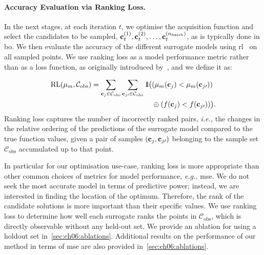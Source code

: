 \paragraph{Accuracy Evaluation via Ranking Loss.}
In the next stages, at each iteration $t$, we optimise the acquisition function and select the candidates to be sampled, $\mathbf{c}_t^{(1)},\mathbf{c}_t^{(2)},\dots,\mathbf{c}_t^{{(n_{\mathrm{batch}})}}$, as is typically done in \gls{bo}. We then evaluate the accuracy of the different surrogate models using \gls{rl}~\citep{FeuEtAl22b} on all sampled points.
We use ranking loss as a model performance metric
rather than as a loss function, as originally introduced by~\citet{WisEtAl16}, and we define it as:

    \begin{equation}
\label{eq:ch06:rl}
    \begin{aligned}
       \text{RL}(\mu_m, \mathcal C_{\mathrm{obs}}) =
        \sum_{\mathbf{c}_j\in \mathcal C_{\mathrm{obs}}}
        \sum_{\mathbf{c}_{j\prime}\in \mathcal C_{\mathrm{obs}}}
        {1\kern-0.25em\text{l}}\big(
        &(\mu_m(\mathbf{c}_j) < \mu_m(\mathbf{c}_{j\prime})) \\
        &\oplus (f(\mathbf{c}_j) < f(\mathbf{c}_{j\prime}))
        \big).
    \end{aligned}
\end{equation}
Ranking loss captures the number of incorrectly ranked pairs, \emph{i.e.,} the changes in the relative ordering of the predictions of the surrogate model compared to the true function values, given a pair of samples $(\mathbf{c}_j,\mathbf{c}_{j\prime})$ belonging to the sample set $\mathcal C_{\mathrm{obs}}$ accumulated up to that point.

In particular for our optimisation use-case, ranking loss is more appropriate than other common choices of metrics for model performance, \emph{e.g.,} \gls{mse}.
We do not seek the most accurate model in terms of predictive power; instead, we are interested in finding the location of the optimum.
Therefore, the rank of the candidate solutions is more important than their specific values.
We use ranking loss to determine how well each surrogate ranks the points in $\mathcal C_{\mathrm{obs}}$, which is directly observable without any held-out set.
We provide an ablation for using a holdout set in~\cref{sec:ch06:ablations}.
Additional results on the performance of our method in terms of \gls{mse} are also provided in~\cref{sec:ch06:ablations}.

